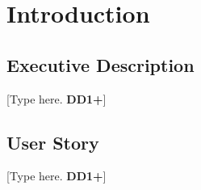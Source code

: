 \clearpage
\section{Introduction}
\subsection{Executive Description}
[Type here. \textbf{DD1+}]
\subsection{User Story}
[Type here. \textbf{DD1+}]